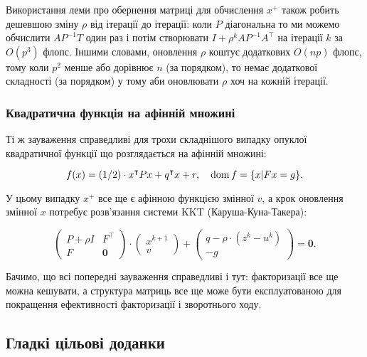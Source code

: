 \begin{remark}
    Використання леми про обернення матриці для обчислення $x^+$ також робить дешевшою зміну $\rho$ від ітерації до ітерації: коли $P$ діагональна то ми можемо обчислити $AP^{-1}T$ один раз і потім створювати $I + \rho^{k} A P^{-1} A^\intercal$ на ітерації $k$ за $O\left(p^3\right)$ флопс. Іншими словами, оновлення $\rho$ коштує додаткових $O(np)$ флопс, тому коли $p^2$ менше або дорівнює $n$ (за порядком), то немає додаткової складності (за порядком) у тому аби оновлювати $\rho$ хоч на кожній ітерації.
\end{remark}

\subsubsection{Квадратична функція на афінній множині}

Ті ж зауваження справедливі для трохи складнішого випадку опуклої квадратичної функції що розглядається на афінній множині:

\begin{equation}
	f(x) = (1 / 2) \cdot x^\intercal P x + q^\intercal x + r, \quad \operatorname{dom} f = \{ x | F x = g \}.
\end{equation}

У цьому випадку $x^+$ все ще є афінною функцією змінної $v$, а крок оновлення змінної $x$ потребує розв'язання системи KKT (Каруша-Куна-Такера):

\begin{equation}
	\begin{pmatrix} P + \rho I & F^\intercal \\ F & \textbf{0} \end{pmatrix} \cdot
	\begin{pmatrix} x^{k + 1} \\ v \end{pmatrix} +
	\begin{pmatrix} q - \rho \cdot (z^k - u^k) \\ -g \end{pmatrix} = \textbf{0}.
\end{equation}

Бачимо, що всі попередні зауваження справедливі і тут: факторизації все ще можна кешувати, а структура матриць все ще може бути експлуатованою для покращення ефективності факторизації і зворотнього ходу.

\subsection{Гладкі цільові доданки}

